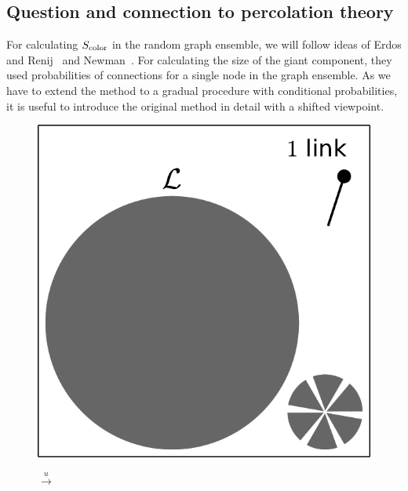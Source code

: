 \documentclass[aps, pre, onecolumn, a4paper, floatfix]{revtex4}
\begin{document}
\subsection{Question and connection to percolation theory}

For calculating $S_{\rm color}$ in the random graph ensemble, 
we will follow ideas of Erdos and Renij~\cite{erd-1959random} and Newman~\cite{newman-2001random}. 
For calculating the size of the giant component, 
they used probabilities of connections for a single node in the graph ensemble. 
As we have to extend the method to a gradual procedure with conditional probabilities, 
it is useful to introduce the original method in detail with a shifted viewpoint. 

\begin{figure}[htb]
  \begin{minipage}[b]{0.18\linewidth}
    \begin{center}
      \includegraphics[width=0.99\columnwidth]{sets_gc_all1.pdf}
   \end{center}
  \end{minipage}
  \begin{minipage}[b]{0.05\linewidth}
    \begin{center}
      {\large $\xrightarrow{u}$}\\
      \vspace{15mm}

\end{center}
\end{minipage}
\end{figure}
\end{document}
